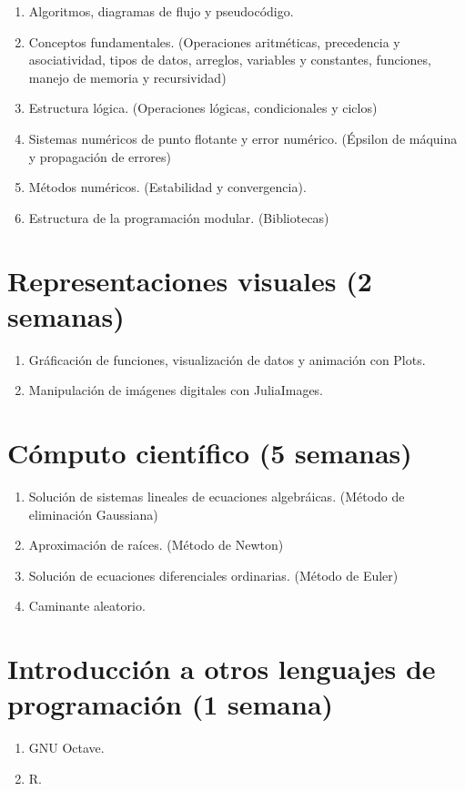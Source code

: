 \documentclass[a4paper]{article}
\begin{document}
\begin{enumerate}[label=\arabic*.]

    \item Algoritmos, diagramas de flujo y pseudocódigo.
    \item Conceptos fundamentales. (Operaciones aritméticas, precedencia y asociatividad, tipos de datos, arreglos, variables y constantes, funciones, manejo de memoria y recursividad)
    \item Estructura lógica. (Operaciones lógicas, condicionales y ciclos)
    \item Sistemas numéricos de punto flotante y error numérico. (Épsilon de máquina y propagación de errores)
    \item Métodos numéricos. (Estabilidad y convergencia).
    \item Estructura de la programación modular. (Bibliotecas)
\end{enumerate}

\section{Representaciones visuales (2 semanas)} \label{Sec: Representaciones visuales (2 semanas)}

\begin{enumerate}[label=\arabic*.]

    \item Gráficación de funciones, visualización de datos y animación con Plots.
    \item Manipulación de imágenes digitales con JuliaImages.
\end{enumerate}

\section{Cómputo científico (5 semanas)} \label{Sec: Cómputo científico: construcción de pseudocódigo e implementación en código (8 semanas)}

\begin{enumerate}[label=\arabic*.]

    \item Solución de sistemas lineales de ecuaciones algebráicas. (Método de eliminación Gaussiana)
    \item Aproximación de raíces. (Método de Newton)
    \item Solución de ecuaciones diferenciales ordinarias. (Método de Euler)
    \item Caminante aleatorio.
\end{enumerate}

\section{Introducción a otros lenguajes de programación (1 semana)} \label{Sec: Introducción a otros lenguajes de programación (1 semana)}

\begin{enumerate}[label=\arabic*.]

    \item GNU Octave.
    \item R.
\end{enumerate}
\end{document}
